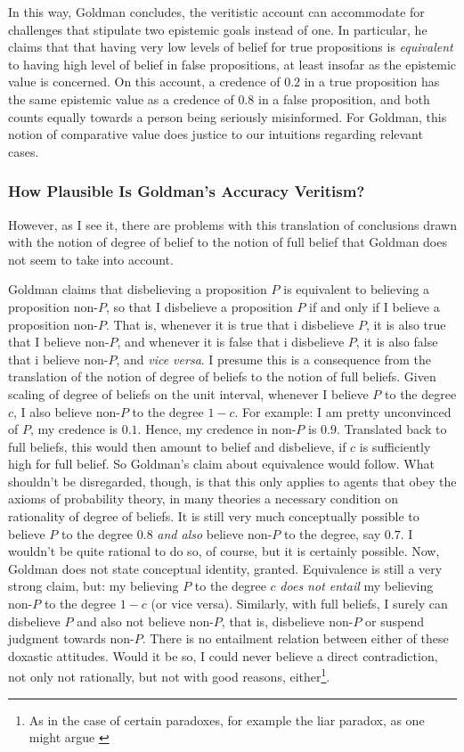 \documentclass[12pt,numbers=noenddot]{scrartcl}
\begin{document}
In this way, Goldman concludes, the veritistic account can accommodate for challenges that stipulate two epistemic goals instead of one. In particular, he claims that that having very low levels of belief for true propositions is \emph{equivalent} to having high level of belief in false propositions, at least insofar as the epistemic value is concerned. On this account, a credence of $0.2$ in a true proposition has the same epistemic value as a credence of $0.8$ in a false proposition, and both counts equally towards a person being  seriously misinformed. For Goldman, this notion of comparative value does justice to our intuitions regarding relevant cases.

\subsubsection{How Plausible Is Goldman's Accuracy Veritism?}

However, as I see it, there are problems with this translation of conclusions drawn with the notion of degree of belief to the notion of full belief that Goldman does not seem to take into account.

Goldman claims that disbelieving a proposition $P$ is equivalent to believing a proposition non-$P$, so that I disbelieve a proposition $P$ if and only if I believe a proposition non-$P$. That is, whenever it is true that i disbelieve $P$, it is also true that I believe non-$P$, and whenever it is false that i disbelieve $P$, it is also false that i believe non-$P$, and \emph{vice versa}. I presume this is a consequence from the translation of the notion of degree of beliefs to the notion of full beliefs. Given scaling of degree of beliefs on the unit interval, whenever I believe $P$ to the degree $c$, I also believe non-$P$ to the degree $1-c$.  For example: I am pretty unconvinced of $P$, my credence is $0.1$. Hence, my credence in non-$P$ is $0.9$. Translated back to full beliefs, this would then amount to belief and disbelieve, if $c$ is sufficiently high for full belief. So Goldman's claim about equivalence would follow. What shouldn't be disregarded, though, is that this only applies to agents that obey the axioms of probability theory, in many theories a necessary condition on rationality of degree of beliefs. It is still very much conceptually possible to believe $P$ to the degree $0.8$ \emph{and also} believe non-$P$ to the degree, say $0.7$. I wouldn't be quite rational to do so, of course, but it is certainly possible. Now, Goldman does not state conceptual identity, granted. Equivalence is still a very strong claim, but: my believing $P$ to the degree $c$ \emph{does not entail} my believing non-$P$ to the degree $1-c$ (or vice versa). Similarly, with full beliefs, I surely can disbelieve $P$ and also not believe non-$P$, that is, disbelieve non-$P$ or suspend judgment towards non-$P$. There is no entailment relation between either of these doxastic attitudes. Would it be so, I could never believe a direct contradiction, not only not rationally, but not with good reasons, either\footnote{As in the case of certain paradoxes, for example the liar paradox, as one might argue \textcite{Priest1998-PRIWIS}}.
\end{document}

